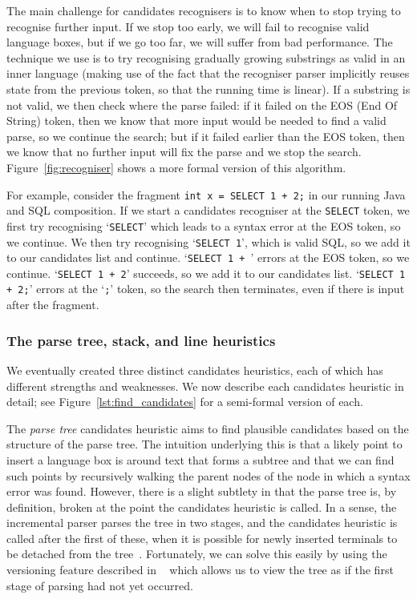 \documentclass[sigplan,screen]{acmart}\settopmatter{printfolios=true,printccs=false,printacmref=false}
\begin{document}
The main challenge for candidates recognisers is to know when to stop trying to recognise
further input. If we stop too early, we will fail to recognise valid language
boxes, but if we go too far, we will suffer from bad performance. The technique
we use is to try recognising gradually growing substrings as valid in an inner
language (making use of the fact that the recogniser parser implicitly
reuses state from the previous token, so that the running time is linear).
If a substring is not valid, we then check where the parse failed:
if it failed on the EOS (End Of String) token, then we know that more input
would be needed to find a valid parse, so we continue the search; but if it
failed earlier than the EOS token, then we know that no further input will
fix the parse and we stop the search. Figure~\ref{fig:recogniser} shows a
more formal version of this algorithm.

For example, consider the fragment \texttt{int x = SELECT 1 + 2;} in our
running Java and SQL composition. If we start a candidates recogniser at the
\texttt{SELECT} token, we first try recognising `\texttt{SELECT}' which leads
to a syntax error at the EOS token, so we continue. We then try recognising
`\texttt{SELECT 1}', which is valid SQL, so we add it to our candidates list
and continue. `\texttt{SELECT 1 + }' errors at the EOS token, so we continue.
`\texttt{SELECT 1 + 2}' succeeds, so we add it to our candidates list.
`\texttt{SELECT 1 + 2;}' errors at the `\texttt{;}' token, so the search then
terminates, even if there is input after the fragment.


\subsubsection{The parse tree, stack, and line heuristics}

We eventually created three distinct candidates heuristics, each of which has
different strengths and weaknesses. We now describe each candidates heuristic
in detail; see Figure~\ref{lst:find_candidates} for a semi-formal version of
each.

The \emph{parse tree} candidates heuristic aims to
find plausible candidates based on the structure of the parse tree. The
intuition underlying this is that a likely point to insert a language box is
around text that forms a subtree and that we can find such points by
recursively walking the parent nodes of the node in which a syntax error was
found. However, there is a slight subtlety in that the parse tree is, by
definition, broken at the point the candidates heuristic is called. In a sense,
the incremental parser parses the tree in two stages, and the candidates
heuristic is called after the first of these, when it is possible for newly
inserted terminals to be detached from the tree~\cite[p.~58, 60]{wagner98practicalalgorithms}. Fortunately, we can solve this
easily by using the versioning feature described in ~\citet[p.~15]{wagner98practicalalgorithms}
which allows
us to view the tree as if the first stage of parsing had not yet occurred.
\end{document}
